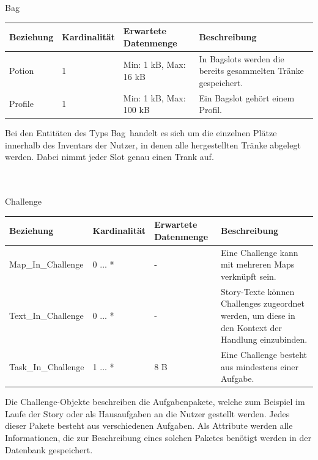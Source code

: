 \newpage
\begin{entity}{20}{Bag}
\begin{center}
	\begin{longtable}{|m{4cm}|m{}|m{}|m{}|}
 	 \hline
 	 \textbf{Beziehung} & \textbf{Kardinalität} &  \textbf{Erwartete Datenmenge} & \textbf{Beschreibung} \\
  	\hline
  	Potion & 1  & Min: 1 kB, Max: 16 kB & In Bagslots werden die bereits gesammelten Tränke gespeichert.\\
	  \hline
  	Profile & 1  & Min: 1 kB, Max: 100 kB & Ein Bagslot gehört einem Profil.\\
	  \hline
	\end{longtable}
\end{center}
Bei den Entitäten des Typs \glqq Bag\grqq~handelt es sich um die einzelnen Plätze innerhalb des Inventars der Nutzer, in denen alle hergestellten Tränke abgelegt werden. Dabei nimmt jeder Slot genau einen Trank auf. \\\\\
\end{entity}


\begin{entity}{30}{Challenge}
\begin{center}
	\begin{longtable}{|m{4cm}|m{}|m{}|m{}|}
 	 \hline
 	 \textbf{Beziehung} & \textbf{Kardinalität} &  \textbf{Erwartete Datenmenge} & \textbf{Beschreibung} \\
  	\hline
  	Map\_In\_Challenge & 0 ... *  & - & Eine Challenge kann mit mehreren Maps verknüpft sein.\\
	  \hline
  	Text\_In\_Challenge & 0 ... *  & - & Story-Texte können Challenges zugeordnet werden, um diese in den Kontext der Handlung einzubinden. \\
	  \hline
	Task\_In\_Challenge & 1 ... * & 8 B & Eine Challenge besteht aus mindestens einer Aufgabe.\\
	  \hline
	\end{longtable}
\end{center}
Die \glqq Challenge\grqq-Objekte beschreiben die Aufgabenpakete, welche zum Beispiel im Laufe der Story oder als Hausaufgaben an die Nutzer gestellt werden. Jedes dieser Pakete besteht aus verschiedenen Aufgaben. Als Attribute werden alle Informationen, die zur Beschreibung eines solchen Paketes benötigt werden in der Datenbank gespeichert.\\\\\\\
\end{entity}

